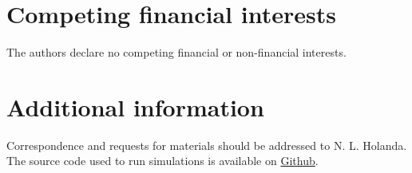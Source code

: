 \documentclass[10pt]{revtex4-1}
\begin{document}
\section*{Competing financial interests}

The authors declare no competing financial or non-financial interests.

\section*{Additional information}

Correspondence and requests for materials should be addressed to N. L. Holanda. The source code used to run simulations is available on \href{https://github.com/linneuholanda/ml_topological_phases_in_real_space}{Github}.
\end{document}
